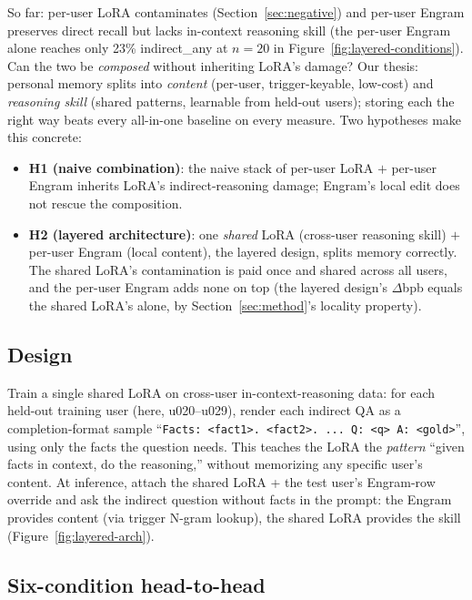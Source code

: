 \documentclass[letterpaper]{article} %
\begin{document}
So far: per-user LoRA contaminates (Section~\ref{sec:negative})
and per-user Engram preserves direct recall but lacks in-context
reasoning skill (the per-user Engram alone reaches only 23\%
indirect\_any at $n{=}20$ in
Figure~\ref{fig:layered-conditions}). Can the two be \emph{composed}
without inheriting LoRA's damage? Our thesis: personal memory
splits into \emph{content} (per-user, trigger-keyable,
low-cost) and \emph{reasoning skill} (shared patterns,
learnable from held-out users); storing each the right way beats
every all-in-one baseline on every measure. Two
hypotheses make this concrete:
\begin{itemize}[leftmargin=*,topsep=2pt,itemsep=1pt]
  \item \textbf{H1 (naive combination)}: the naive stack of
        per-user LoRA $+$ per-user Engram inherits
        LoRA's indirect-reasoning damage; Engram's local edit does
        not rescue the composition.
  \item \textbf{H2 (layered architecture)}: one \emph{shared}
        LoRA (cross-user reasoning skill) $+$ per-user Engram (local
        content), the layered design, splits memory correctly. The
        shared LoRA's contamination is paid once and shared across
        all users, and the per-user Engram adds none on top (the
        layered design's $\Delta$bpb equals the shared LoRA's alone,
        by Section~\ref{sec:method}'s locality property).
\end{itemize}


\subsection{Design}

Train a single shared LoRA on cross-user in-context-reasoning data:
for each held-out training user (here, u020–u029), render each
indirect QA as a completion-format sample
``\texttt{Facts: <fact1>. <fact2>. ... Q: <q> A: <gold>}'', using only
the facts the question needs. This teaches the LoRA the
\emph{pattern} ``given facts in context, do the reasoning,'' without
memorizing any specific user's content. At inference, attach the
shared LoRA + the test user's Engram-row override and ask the indirect
question without facts in the prompt: the Engram provides content (via
trigger N-gram lookup), the shared LoRA provides the skill
(Figure~\ref{fig:layered-arch}).

\subsection{Six-condition head-to-head}
\end{document}
